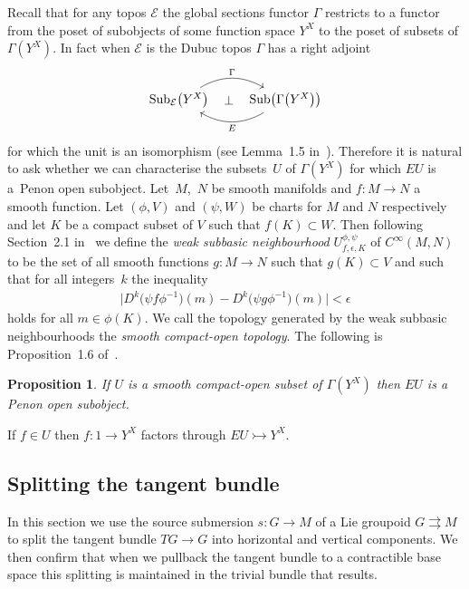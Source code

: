 \documentclass[10pt,a4paper]{amsart}
\numberwithin{equation}{section}
\newtheorem{Proposition}[Theorem]{Proposition}
{ \theoremstyle{definition}
\newtheorem{Definition}[Theorem]{Definition}
\newtheorem{Notation}[Theorem]{Notation}
\newtheorem{Example}[Theorem]{Example}
\newtheorem{Remark}[Theorem]{Remark} }
\begin{document}
Recall that for any topos $ \mathcal{E}$ the global sections functor $\Gamma$ restricts to a functor from the poset of subobjects of some function space $Y^X$ to the poset of subsets of $\Gamma(Y^X)$. In fact when $\mathcal{E}$ is the Dubuc topos $\Gamma$ has a right adjoint
\begin{equation*}
\begin{tikzcd}
 {\rm Sub}_{\mathcal{E}}\big(Y^X\big) \rar[bend left]{\Gamma} \rar[phantom]{\perp} & {\rm Sub}\big(\Gamma\big(Y^X\big)\big) \lar[bend left]{E}
\end{tikzcd}
\end{equation*}
for which the unit is an isomorphism (see Lemma~1.5 in~\cite{MR796353}). Therefore it is natural to ask whether we can characterise the subsets~$U$ of $\Gamma(Y^X)$ for which $EU$ is a~Penon open subobject. Let~$M$,~$N$ be smooth manifolds and $ f \colon M \rightarrow N $ a smooth function. Let $ ( \phi , V ) $ and $ ( \psi , W ) $ be charts for $ M $ and $ N $ respectively and let $ K $ be a compact subset of $ V $ such that $ f ( K ) \subset W $. Then following Section~2.1 in~\cite{MR0448362} we def\/ine the \emph{weak subbasic neighbourhood} $ U_{f , \epsilon, K } ^{ \phi , \psi} $ of $ C^{ \infty } ( M , N ) $ to be the set of all smooth functions $ g \colon M \rightarrow N $ such that $ g ( K ) \subset V $ and such that for all integers~$ k $ the inequality
\begin{gather*}\big|D^k\big(\psi f \phi^{-1}\big) (m) - D^k \big( \psi g \phi^{-1} \big) (m)\big| < \epsilon\end{gather*}
holds for all $m\in\phi(K)$. We call the topology generated by the weak subbasic neighbourhoods the \emph{smooth compact-open topology}. The following is Proposition~1.6 of~\cite{MR796353}.
\begin{Proposition}\label{prop:compact-open-implies-penon}
If $U$ is a smooth compact-open subset of $\Gamma(Y^X)$ then $EU$ is a Penon open subobject.
\end{Proposition}
\begin{Remark}If $f\in U$ then $f\colon 1 \rightarrow Y^X$ factors through $EU \rightarrowtail Y^X$.
\end{Remark}

\subsection{Splitting the tangent bundle}

In this section we use the source submersion $s\colon G\rightarrow M$ of a Lie groupoid $G \rightrightarrows M $ to split the tangent bundle $TG\rightarrow G$ into horizontal and vertical components. We then conf\/irm that when we pullback the tangent bundle to a contractible base space this splitting is maintained in the trivial bundle that results.
\end{document}
